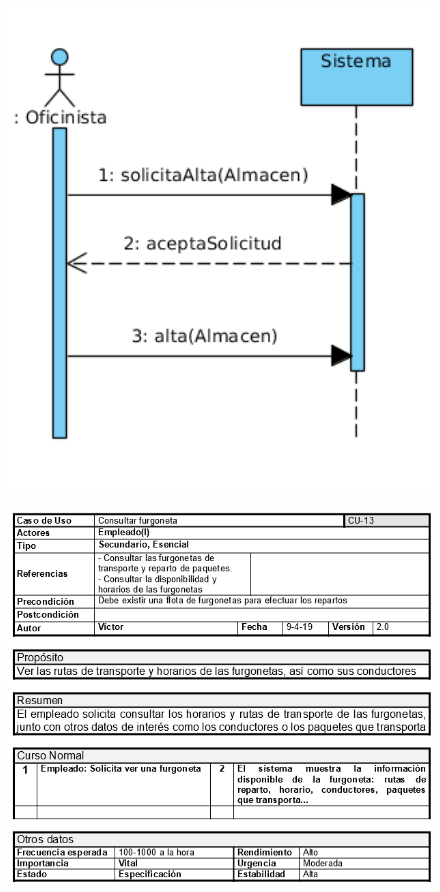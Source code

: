 \begin{figure}[H]
	\centering
	\includegraphics[width=16cm]{12}
\end{figure}
\begin{figure}[H]
	\centering
	\includegraphics[width=16cm]{13}
\end{figure}
